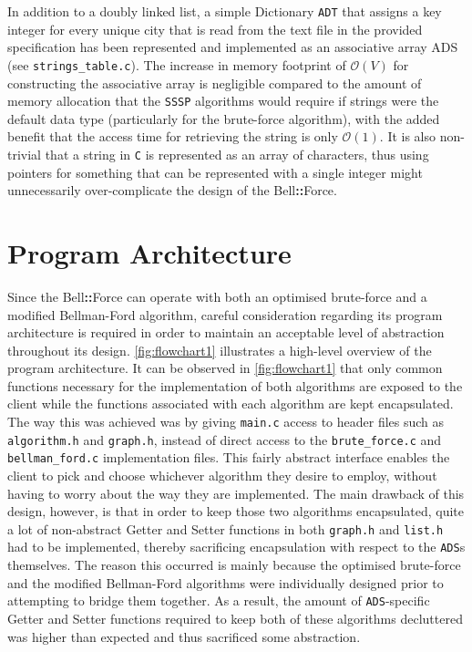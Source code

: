 \documentclass[11pt]{article}
\newcommand{\bellforce}{Bell\hspace*{1.61803398875pt}\textbf{::}\hspace*{1.61803398875pt}Force}
\begin{document}
In addition to a doubly linked list, a simple Dictionary \texttt{ADT} that assigns a key integer for every unique city that is read from the text file in the provided specification has been represented and implemented as an associative array ADS (see \texttt{strings\_table.c}). The increase in memory footprint of $\mathcal{O}(V)$ for constructing the associative array is negligible compared to the amount of memory allocation that the \texttt{SSSP} algorithms would require if strings were the default data type (particularly for the brute-force algorithm), with the added benefit that the access time for retrieving the string is only $\mathcal{O}(1)$. It is also non-trivial that a string in \texttt{C} is represented as an array of characters, thus using pointers for something that can be represented with a single integer might unnecessarily over-complicate the design of the \bellforce{}. 



\section{Program Architecture}

Since the \bellforce{} can operate with both an optimised brute-force and a modified Bellman-Ford algorithm, careful consideration regarding its program architecture is required in order to maintain an acceptable level of abstraction throughout its design. \autoref{fig:flowchart1} illustrates a high-level overview of the program architecture. It can be observed in \autoref{fig:flowchart1} that only common functions necessary for the implementation of both algorithms are exposed to the client while the functions associated with each algorithm are kept encapsulated. The way this was achieved was by giving \texttt{main.c} access to header files such as \texttt{algorithm.h} and \texttt{graph.h}, instead of direct access to the \texttt{brute\_force.c} and \texttt{bellman\_ford.c} implementation files. This fairly abstract interface enables the client to pick and choose whichever algorithm they desire to employ, without having to worry about the way they are implemented. The main drawback of this design, however, is that in order to keep those two algorithms encapsulated, quite a lot of non-abstract Getter and Setter functions in both \texttt{graph.h} and \texttt{list.h} had to be implemented, thereby sacrificing encapsulation with respect to the \texttt{ADS}s themselves. The reason this occurred is mainly because the optimised brute-force and the modified Bellman-Ford algorithms were individually designed prior to attempting to bridge them together. As a result, the amount of \texttt{ADS}-specific Getter and Setter functions required to keep both of these algorithms decluttered was higher than expected and thus sacrificed some abstraction. 
 
\end{document}

